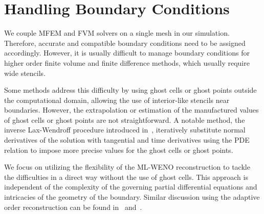 \section{Handling Boundary Conditions}
\label{sec:fvbc}
We couple MFEM and FVM solvers on a single mesh in our simulation. Therefore, 
accurate and compatible boundary conditions need to be assigned accordingly.
However, it is usually difficult to manage boundary conditions for higher order finite volume and finite difference methods, which
usually require wide stencils. 

Some methods address this difficulty by using ghost cells or ghost points outside the computational domain, 
allowing the use of interior-like stencils near boundaries. However, the extrapolation or estimation of the 
manufactured values of ghost cells or ghost points are not straightforward.
A notable method, the inverse
Lax-Wendroff procedure introduced in~\cite{TAN20108144}, iteratively substitute normal derivatives
of the solution with tangential and time derivatives using the PDE relation to impose more precise values
for the ghost cells or ghost points.

We focus on utilizing the flexibility of the ML-WENO reconstruction to
tackle the difficulties in a direct way without the use 
of ghost cells. This approach is independent of the 
complexity of the governing partial differential equations and intricacies 
of the geometry of the boundary. Similar discussion using the adaptive 
order reconstruction can be found in~\cite{Semplice2020} and~\cite{Semplice2023}.


